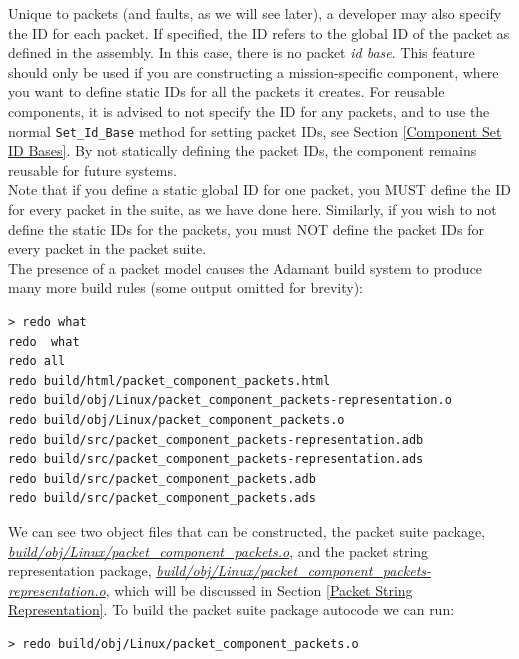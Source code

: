 Unique to packets (and faults, as we will see later), a developer may also specify the ID for each packet. If specified, the ID refers to the global ID of the packet as defined in the assembly. In this case, there is no packet \textit{id base}. This feature should only be used if you are constructing a mission-specific component, where you want to define static IDs for all the packets it creates. For reusable components, it is advised to not specify the ID for any packets, and to use the normal \texttt{Set\_Id\_Base} method for setting packet IDs, see Section \ref{Component Set ID Bases}. By not statically defining the packet IDs, the component remains reusable for future systems. \\

Note that if you define a static global ID for one packet, you MUST define the ID for every packet in the suite, as we have done here. Similarly, if you wish to not define the static IDs for the packets, you must NOT define the packet IDs for every packet in the packet suite. \\

The presence of a packet model causes the Adamant build system to produce many more build rules (some output omitted for brevity):

\vspace{5mm} %
\begin{verbatim}
> redo what 
redo  what
redo all
redo build/html/packet_component_packets.html
redo build/obj/Linux/packet_component_packets-representation.o
redo build/obj/Linux/packet_component_packets.o
redo build/src/packet_component_packets-representation.adb
redo build/src/packet_component_packets-representation.ads
redo build/src/packet_component_packets.adb
redo build/src/packet_component_packets.ads
\end{verbatim}
\vspace{5mm} %

We can see two object files that can be constructed, the packet suite package, \textit{\url{build/obj/Linux/packet\_component\_packets.o}}, and the packet string representation package, \textit{\url{build/obj/Linux/packet\_component\_packets-representation.o}}, which will be discussed in Section \ref{Packet String Representation}. To build the packet suite package autocode we can run:

\vspace{5mm} %
\begin{verbatim}
> redo build/obj/Linux/packet_component_packets.o
\end{verbatim}
\vspace{5mm} %

